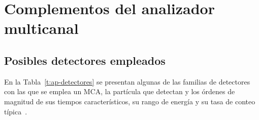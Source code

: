 \chapter{Complementos del analizador multicanal}
\label{C:ap-mca}

\graphicspath{{figs/apendices/}{figs/comunes/}}

\section{Posibles detectores empleados}
\label{S:ap-detectores}

En la Tabla~\ref{t:ap-detectores} se presentan algunas de las familias de
detectores con las que se emplea un MCA, la partícula que detectan y los órdenes
de magnitud de sus tiempos característicos, su rango de energía y su tasa de
conteo típica~\cite{Knoll2010}.

